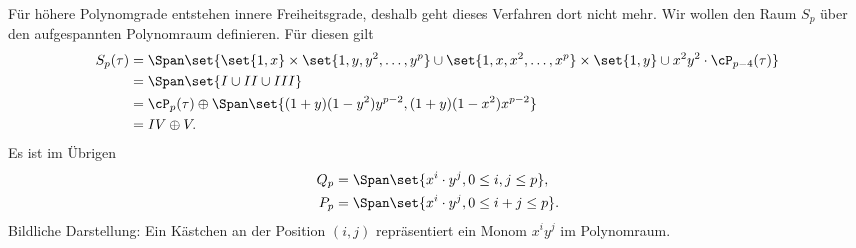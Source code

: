 Für höhere Polynomgrade entstehen innere Freiheitsgrade, deshalb geht dieses Verfahren dort nicht mehr. Wir wollen den Raum $S_{p}$ über den aufgespannten Polynomraum definieren. Für diesen gilt
\begin{align*}
  S_{p}(\tau) &= \Span\set{ \set{1, x} \times \set{1, y, y^{2}, \dots, y^{p}} \cup \set{1, x, x^{2}, \dots, x^{p}} \times \set{1, y} \cup x^{2}y^{2} \cdot\cP_{p-4}(\tau)}\\
&= \Span\set{I \cup II \cup III}\\
&= \cP_{p}(\tau) \oplus \Span \set{(1+y)(1-y^{2})y^{p-2}, (1+y)(1-x^{2})x^{p-2}} \\
&= IV \oplus V.
\end{align*}
Es ist im Übrigen
\begin{align*}
  Q_{p} &= \Span \set{x^{i}\cdot y^{j}, 0 \leq i, j \leq p},\\
  P_{p} &= \Span \set{x^{i}\cdot y^{j}, 0 \leq i + j \leq p}. 
\end{align*}
Bildliche Darstellung: Ein Kästchen an der Position $(i, j)$ repräsentiert ein Monom $x^{i}y^{j}$ im Polynomraum. 

